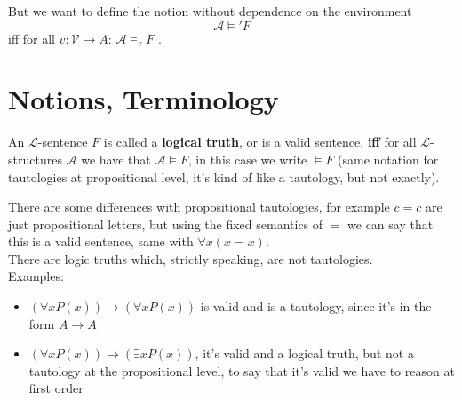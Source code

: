 \newpage

But we want to define the notion without dependence on the environment
$$ \mathcal{A} \models' F$$
iff for all $v: \mathcal{V} \rightarrow A$: $\mathcal{A} \models_v F$ .\\

%	
%	

%
%
%
%
%

\section{Notions, Terminology}

\begin{definition}
	An $\mathcal{L}$-sentence $F$ is called a \textbf{logical truth}, or is a valid sentence, \textbf{iff} for all $\mathcal{L}$-structures $\mathcal{A}$ we have that $\mathcal{A} \models F$, in this case we write $\models F$ (same notation for tautologies at propositional level, it's kind of like a tautology, but not exactly).\\
\end{definition}

There are some differences with propositional tautologies, for example $c=c$ are just propositional letters, but using the fixed semantics of $=$ we can say that this is a valid sentence, same with $\forall x(x=x)$.\\ %
There are logic truths which, strictly speaking, are not tautologies.\\
Examples: 
\begin{itemize}
	\item $(\forall x P(x)) \rightarrow (\forall x P(x))$ is valid and is a tautology, since it's in the form $A \rightarrow A$
	\item $(\forall x P(x)) \rightarrow (\exists x P(x))$, it's valid and a logical truth, but not a tautology at the propositional level, to say that it's valid we have to reason at first order
\end{itemize}


